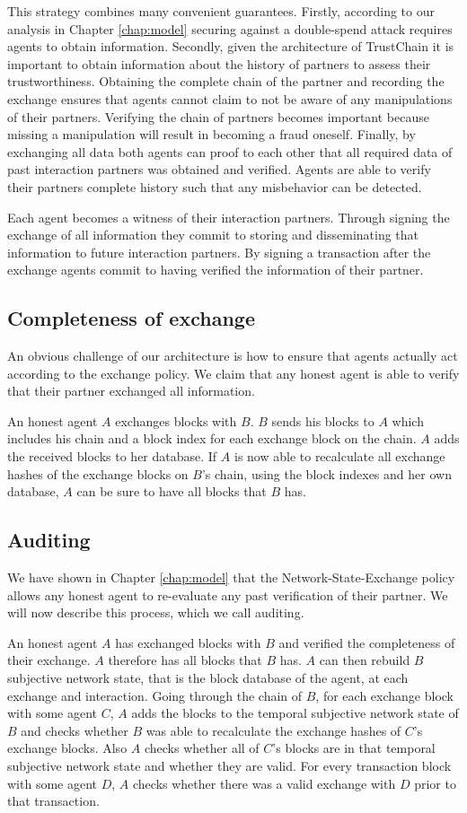 This strategy combines many convenient guarantees. Firstly, according to our analysis in Chapter 
\ref{chap:model} securing against a double-spend attack requires agents to obtain information. 
Secondly, given the architecture of TrustChain it is important to obtain information about the 
history of partners to assess their trustworthiness. Obtaining the complete chain of the partner 
and recording the exchange ensures that agents cannot claim to not be aware of any manipulations of 
their partners. Verifying the chain of partners becomes important because missing a manipulation
will result in becoming a fraud oneself. Finally, by exchanging all data both agents can proof to 
each other that all required data of past interaction partners was obtained and verified. Agents are
able to verify their partners complete history such that any misbehavior can be detected. 

Each agent becomes a witness of their interaction partners. Through signing the exchange of all 
information they commit to storing and disseminating that information to future interaction partners.
By signing a transaction after the exchange agents commit to having verified the information of their
partner.

\subsection{Completeness of exchange}
An obvious challenge of our architecture is how to ensure that agents actually act according to the
exchange policy. We claim that any honest agent is able to verify that their partner exchanged all 
information.

An honest agent $A$ exchanges blocks with $B$. $B$ sends his blocks to $A$ which includes his chain
and a block index for each exchange block on the chain. 
$A$ adds the received blocks to her database. If $A$ is now able to recalculate all exchange hashes
of the exchange blocks on $B$'s chain, using the block indexes and her own database, $A$ can be 
sure to have all blocks that $B$ has.

\subsection{Auditing}
We have shown in Chapter \ref{chap:model} that the Network-State-Exchange policy allows any honest
agent to re-evaluate any past verification of their partner. We will now describe this process, which
we call auditing.

An honest agent $A$ has exchanged blocks with $B$ and verified the completeness of their exchange.
$A$ therefore has all blocks that $B$ has. $A$ can then rebuild $B$ subjective network state, that
is the block database of the agent, at each exchange and interaction. Going through the chain of $B$, 
for each exchange block with some agent $C$, $A$ adds the blocks to the temporal subjective network
state of $B$ and checks whether $B$ was able to recalculate the exchange hashes of $C$'s exchange
blocks. Also $A$ checks whether all of $C$'s blocks are in that temporal subjective network state
and whether they are valid.
For every transaction block with some agent $D$, $A$ checks whether there was a valid exchange with 
$D$ prior to that transaction. 

